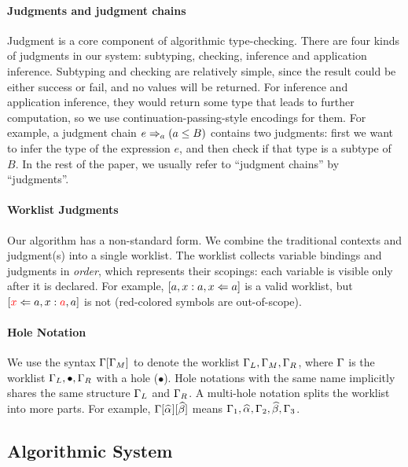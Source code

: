 \paragraph{Judgments and judgment chains} Judgment is a core component of algorithmic type-checking.
There are four kinds of judgments in our system: subtyping, checking, inference and application inference.
Subtyping and checking are relatively simple, since the result could be either success or fail, and no values will be returned.
For inference and application inference, they would return some type that leads to further computation, so we use continuation-passing-style encodings for them.
For example, a judgment chain $e \Rightarrow_a (a \le B)$ contains two judgments: first we want to infer the type of the expression $e$, and then check if that type is a subtype of $B$.
In the rest of the paper, we usually refer to ``judgment chains'' by ``judgments''.

\paragraph{Worklist Judgments} Our algorithm has a non-standard form.
We combine the traditional contexts and judgment(s) into a single worklist.
The worklist collects variable bindings and judgments in \emph{order}, which represents their scopings:
each variable is visible only after it is declared.
For example, $[a,x:a,x \Leftarrow a]$ is a valid worklist, but $[\textcolor{red}{x} \Leftarrow a, x:\textcolor{red}{a},a]$ is not (red-colored symbols are out-of-scope).

\paragraph{Hole Notation}
We use the syntax $\Gamma[\Gamma_M]$ to denote the worklist $\Gamma_L,\Gamma_M,\Gamma_R$,
where $\Gamma$ is the worklist $\Gamma_L,\bullet,\Gamma_R$ with a hole ($\bullet$).
Hole notations with the same name implicitly shares the same structure $\Gamma_L$ and $\Gamma_R$.
A multi-hole notation splits the worklist into more parts.
For example, $\Gm[\al][\bt]$ means $\Gm_1,\al,\Gm_2,\bt,\Gm_3$.

\subsection{Algorithmic System}

\newcommand \algrule {\stepcounter{algRuleCounter}\rrule{\arabic{algRuleCounter}}}

